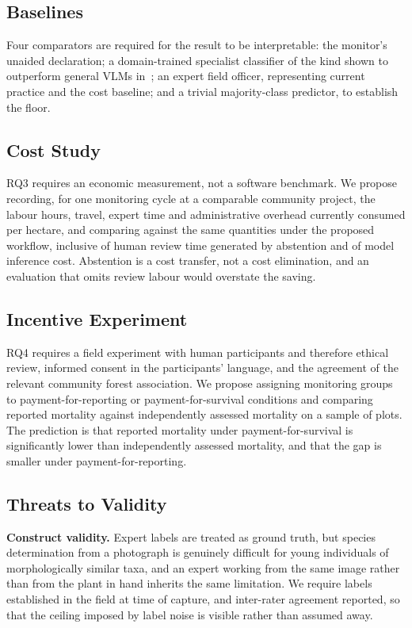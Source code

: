 \documentclass[10pt,twocolumn,a4paper]{article}
\begin{document}
\subsection{Baselines}

Four comparators are required for the result to be interpretable: the
monitor's unaided declaration; a domain-trained specialist classifier of the
kind shown to outperform general VLMs in~\cite{zhou2026}; an expert field
officer, representing current practice and the cost baseline; and a trivial
majority-class predictor, to establish the floor.

\subsection{Cost Study}

RQ3 requires an economic measurement, not a software benchmark. We propose
recording, for one monitoring cycle at a comparable community project, the
labour hours, travel, expert time and administrative overhead currently consumed
per hectare, and comparing against the same quantities under the proposed
workflow, inclusive of human review time generated by abstention and of model
inference cost. Abstention is a cost transfer, not a cost elimination, and an
evaluation that omits review labour would overstate the saving.

\subsection{Incentive Experiment}

RQ4 requires a field experiment with human participants and therefore ethical
review, informed consent in the participants' language, and the agreement of the
relevant community forest association. We propose assigning monitoring groups to
payment-for-reporting or payment-for-survival conditions and comparing reported
mortality against independently assessed mortality on a sample of plots. The
prediction is that reported mortality under payment-for-survival is
significantly lower than independently assessed mortality, and that the gap is
smaller under payment-for-reporting.

\subsection{Threats to Validity}

\textbf{Construct validity.} Expert labels are treated as ground truth, but
species determination from a photograph is genuinely difficult for young
individuals of morphologically similar taxa, and an expert working from the same
image rather than from the plant in hand inherits the same limitation. We
require labels established in the field at time of capture, and inter-rater
agreement reported, so that the ceiling imposed by label noise is visible rather
than assumed away.
\end{document}

